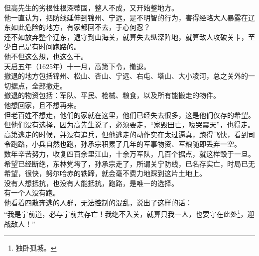 \begin{multicols}{\theparacolNo}
但高先生的劣根性根深蒂固，整人不成，又开始整地方。\\

他一直认为，把防线延伸到锦州、宁远，是不明智的行为，害得经略大人暴露在辽东如此危险的地方，有家都回不去，于心何忍？\\

还不如放弃整个辽东，退守到山海关，就算失去纵深阵地，就算敌人攻破关卡，至少自己是有时间跑路的。\\

他不但这么想，也这么干。\\

天启五年（1625年）十一月，高第下令，撤退。\\

撤退的地方包括锦州、松山、杏山、宁远、右屯、塔山、大小凌河，总之关外的一切据点，全部撤走。\\

撤退的物资包括：军队、平民、枪械、粮食，以及所有能搬走的物件。\\

他想回家，且不想再来。\\

但老百姓不想走，他们的家就在这里，他们已经失去很多，这是他们仅存的希望。\\

但他们没有选择，因为高先生说了，必须要走，“家毁田亡，嚎哭震天”，也得走。\\

高第逃走的时候，并没有追兵，但他逃走的动作实在太过逼真，跑得飞快，看到司令跑路，小兵自然也跑，孙承宗积累了几年的军事物资、军粮随即丢弃一空。\\

数年辛苦努力，收复四百余里江山，十余万军队，几百个据点，就这样毁于一旦。\\

希望已经断绝，东林党垮了，孙承宗走了，所谓关宁防线，已名存实亡，时局已无希望，很快，努尔哈赤的铁蹄，就会毫不费力地踩到这片土地上。\\

没有人想抵抗，也没有人能抵抗，跑路，是唯一的选择。\\

有一个人没有跑。\\

他看着四散奔逃的人群，无法控制的混乱，说出了这样的话：\\

“我是宁前道，必与宁前共存亡！我绝不入关，就算只我一人，也要守在此处\footnote{独卧孤城。}，迎战敌人！”\\


\end{multicols}
